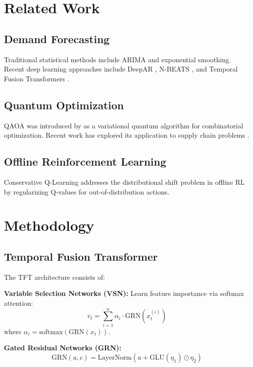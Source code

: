 \documentclass{article}
\begin{document}
\section{Related Work}

\subsection{Demand Forecasting}
Traditional statistical methods include ARIMA \cite{box2015time} and exponential smoothing. 
Recent deep learning approaches include DeepAR \cite{salinas2020deepar}, N-BEATS 
\cite{oreshkin2019nbeats}, and Temporal Fusion Transformers \cite{lim2021temporal}.

\subsection{Quantum Optimization}
QAOA was introduced by \cite{farhi2014quantum} as a variational quantum algorithm for 
combinatorial optimization. Recent work has explored its application to supply chain 
problems \cite{ajagekar2020quantum}.

\subsection{Offline Reinforcement Learning}
Conservative Q-Learning \cite{kumar2020conservative} addresses the distributional shift 
problem in offline RL by regularizing Q-values for out-of-distribution actions.

\section{Methodology}

\subsection{Temporal Fusion Transformer}

The TFT architecture consists of:

\textbf{Variable Selection Networks (VSN):} Learn feature importance via softmax attention:
\begin{equation}
    v_t = \sum_{i=1}^{n} \alpha_i \cdot \text{GRN}(x_t^{(i)})
\end{equation}
where $\alpha_i = \text{softmax}(\text{GRN}(x_t))$.

\textbf{Gated Residual Networks (GRN):}
\begin{equation}
    \text{GRN}(a, c) = \text{LayerNorm}(a + \text{GLU}(\eta_1) \odot \eta_2)
\end{equation}
\end{document}
